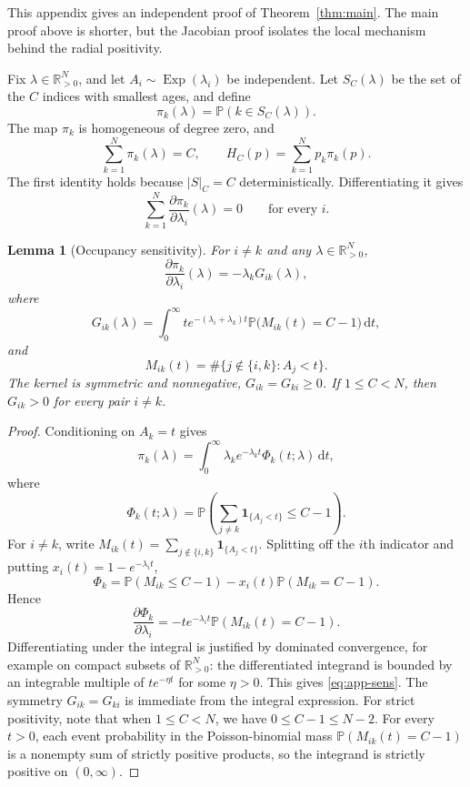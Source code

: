 \documentclass[11pt]{article}
\newtheorem{lemma}[theorem]{Lemma}
\theoremstyle{remark}
\newcommand{\R}{\mathbb{R}}
\newcommand{\dd}{\,\mathrm{d}}
\newcommand{\Pp}{\mathbb{P}}
\newcommand{\Exp}{\operatorname{Exp}}
\newcommand{\card}[1]{\lvert #1\rvert}
\newcommand{\one}{\mathbf{1}}
\begin{document}
This appendix gives an independent proof of Theorem~\ref{thm:main}.  The
main proof above is shorter, but the Jacobian proof isolates the local
mechanism behind the radial positivity.

Fix $\lambda\in\R^N_{>0}$, and let
$A_i\sim\Exp(\lambda_i)$ be independent.  Let $S_C(\lambda)$ be the set
of the $C$ indices with smallest ages, and define
\[
        \pi_k(\lambda)=\Pp(k\in S_C(\lambda)).
\]
The map $\pi_k$ is homogeneous of degree zero, and
\begin{equation}\label{eq:app-sums}
        \sum_{k=1}^N\pi_k(\lambda)=C,
        \qquad
        H_C(p)=\sum_{k=1}^Np_k\pi_k(p).
\end{equation}
The first identity holds because $\card S_C=C$ deterministically.
Differentiating it gives
\begin{equation}\label{eq:app-rowsum}
        \sum_{k=1}^N\frac{\partial\pi_k}{\partial\lambda_i}(\lambda)=0
        \qquad\text{for every }i.
\end{equation}

\begin{lemma}[Occupancy sensitivity]\label{lem:app-sens}
For $i\ne k$ and any $\lambda\in\R^N_{>0}$,
\begin{equation}\label{eq:app-sens}
        \frac{\partial\pi_k}{\partial\lambda_i}(\lambda)
        =-\lambda_k G_{ik}(\lambda),
\end{equation}
where
\[
        G_{ik}(\lambda)
        =
        \int_0^\infty t e^{-(\lambda_i+\lambda_k)t}
        \Pp\bigl(M_{ik}(t)=C-1\bigr)\dd t,
\]
and
\[
        M_{ik}(t)=\#\{j\notin\{i,k\}:A_j<t\}.
\]
The kernel is symmetric and nonnegative, $G_{ik}=G_{ki}\ge0$.  If
$1\le C<N$, then $G_{ik}>0$ for every pair $i\ne k$.
\end{lemma}

\begin{proof}
Conditioning on $A_k=t$ gives
\[
        \pi_k(\lambda)
        =
        \int_0^\infty \lambda_k e^{-\lambda_k t}\Phi_k(t;\lambda)\dd t,
\]
where
\[
        \Phi_k(t;\lambda)
        =
        \Pp\left(\sum_{j\ne k}\one_{\{A_j<t\}}\le C-1\right).
\]
For $i\ne k$, write
$M_{ik}(t)=\sum_{j\notin\{i,k\}}\one_{\{A_j<t\}}$.  Splitting off the
$i$th indicator and putting $x_i(t)=1-e^{-\lambda_i t}$,
\[
        \Phi_k
        =\Pp(M_{ik}\le C-1)-x_i(t)\Pp(M_{ik}=C-1).
\]
Hence
\[
        \frac{\partial\Phi_k}{\partial\lambda_i}
        =-t e^{-\lambda_i t}\Pp(M_{ik}(t)=C-1).
\]
Differentiating under the integral is justified by dominated convergence,
for example on compact subsets of $\R^N_{>0}$: the differentiated
integrand is bounded by an integrable multiple of $t e^{-\eta t}$ for
some $\eta>0$.  This gives \eqref{eq:app-sens}.  The symmetry
$G_{ik}=G_{ki}$ is immediate from the integral expression.
For strict positivity, note that when $1\le C<N$, we have
$0\le C-1\le N-2$.  For every $t>0$, each event probability in the
Poisson-binomial mass $\Pp(M_{ik}(t)=C-1)$ is a nonempty sum of strictly
positive products, so the integrand is strictly positive on $(0,\infty)$.
\end{proof}
\end{document}
